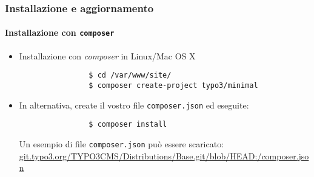 \begin{frame}[fragile]
	\frametitle{Installazione e aggiornamento}
	\framesubtitle{Installazione con \texttt{composer}}

	\begin{itemize}
		\item Installazione con \textit{composer} in Linux/Mac OS X

			\begin{lstlisting}
				$ cd /var/www/site/
				$ composer create-project typo3/minimal
			\end{lstlisting}

		\item In alternativa, create il vostro file \texttt{composer.json} ed eseguite:

			\begin{lstlisting}
				$ composer install
			\end{lstlisting}

			Un esempio di file \texttt{composer.json} può essere scaricato:\newline
			\small
				\href{https://git.typo3.org/TYPO3CMS/Distributions/Base.git/blob/HEAD:/composer.json}{git.typo3.org/TYPO3CMS/Distributions/Base.git/blob/HEAD:/composer.json}
			\normalsize

	\end{itemize}
\end{frame}

